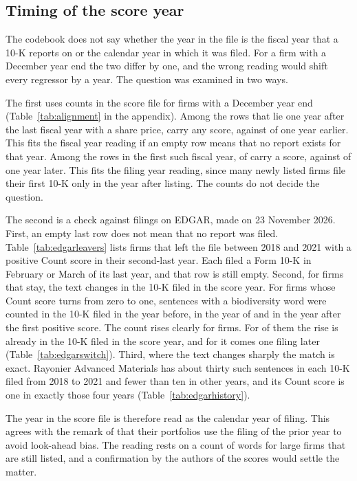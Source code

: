 \documentclass[12pt,a4paper]{article}
\begin{document}
\subsection{Timing of the score year}

The codebook does not say whether the year in the file is the fiscal year that a 10-K reports on or the calendar year in which it was filed. For a firm with a December year end the two differ by one, and the wrong reading would shift every regressor by a year. The question was examined in two ways.

The first uses counts in the score file for firms with a December year end (Table~\ref{tab:alignment} in the appendix). Among the \nTrailRows{} rows that lie one year after the last fiscal year with a share price, \nTrailFilled{} carry any score, against \nTrailBeforeFilled{} of \nTrailBefore{} one year earlier. This fits the fiscal year reading if an empty row means that no report exists for that year. Among the rows in the first such fiscal year, \nFirstFilled{} of \nFirstRows{} carry a score, against \nFirstNextFilled{} of \nFirstNext{} one year later. This fits the filing year reading, since many newly listed firms file their first 10-K only in the year after listing. The counts do not decide the question.

The second is a check against filings on EDGAR, made on 23 November 2026. First, an empty last row does not mean that no report was filed. Table~\ref{tab:edgarleavers} lists \nEdgarLeavers{} firms that left the file between 2018 and 2021 with a positive Count score in their second-last year. Each filed a Form 10-K in February or March of its last year, and that row is still empty. Second, for firms that stay, the text changes in the 10-K filed in the score year. For \nEdgarSwitch{} firms whose Count score turns from zero to one, sentences with a biodiversity word were counted in the 10-K filed in the year before, in the year of and in the year after the first positive score. The count rises clearly for \nEdgarClear{} firms. For \nEdgarFiling{} of them the rise is already in the 10-K filed in the score year, and for \nEdgarFiscal{} it comes one filing later (Table~\ref{tab:edgarswitch}). Third, where the text changes sharply the match is exact. Rayonier Advanced Materials has about thirty such sentences in each 10-K filed from 2018 to 2021 and fewer than ten in other years, and its Count score is one in exactly those four years (Table~\ref{tab:edgarhistory}).

The year in the score file is therefore read as the calendar year of filing. This agrees with the remark of \citet{giglio2026} that their portfolios use the filing of the prior year to avoid look-ahead bias. The reading rests on a count of words for large firms that are still listed, and a confirmation by the authors of the scores would settle the matter.
\end{document}
